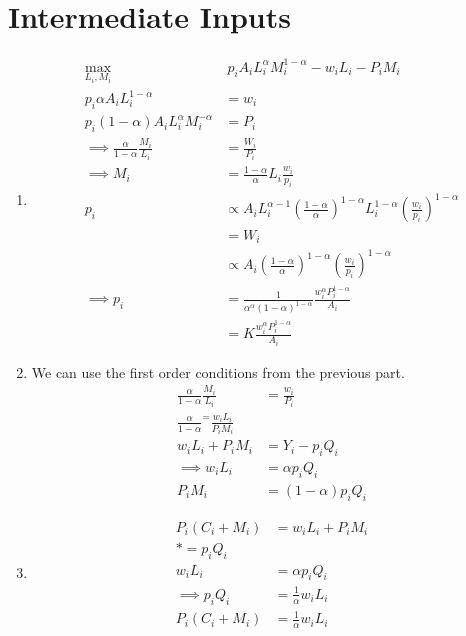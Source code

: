 \documentclass{article}
\begin{document}
\section{Intermediate Inputs}
\begin{enumerate}
    \item 
    \begin{align*}
        \max_{L_i, M_i} &\ p_i A_i L_i^\alpha M_i^{1 - \alpha} - w_i L_i - P_i M_i \\
        p_i \alpha A_i L_i^{1 - \alpha} &= w_i \tag{$L_i$}\\
        p_i(1 - \alpha) A_i L_i^\alpha M_i^{-\alpha} &= P_i \tag{$M_i$}\\
        \implies \frac{\alpha}{1 - \alpha} \frac{M_i}{L_i} &= \frac{W_i}{P_i}\\
        \implies M_i &= \frac{1 - \alpha}{\alpha} L_i \frac{w_i}{p_i}\\
        p_i &\propto A_i L_i^{\alpha - 1} \left(\frac{1 - \alpha}{\alpha}\right)^{1 - \alpha} L_i^{1 - \alpha} \left(\frac{w_i}{p_i}\right)^{1 - \alpha}\\
        &= W_i\\
        &\propto A_i \left(\frac{1 - \alpha}{\alpha}\right)^{1 - \alpha} \left(\frac{w_i}{p_i}\right)^{1 - \alpha}\\
        \implies p_i &= \frac{1}{\alpha^\alpha(1 - \alpha)^{1 - \alpha}} \frac{w_i^\alpha P_i^{1 - \alpha}}{A_i}\\
        &= K \frac{w_i^\alpha P_i^{1 - \alpha}}{A_i}
    \end{align*}
    \item
    We can use the first order conditions from the previous part.
    \begin{align*}
        \frac{\alpha}{1 - \alpha} \frac{M_i}{L_i} &= \frac{w_i}{P_i}\\
        \frac{\alpha}{1 - \alpha} ^= \frac{w_i L_i}{P_i M_i}\\
        w_i L_i + P_i M_i &= Y_i - p_i Q_i\\
        \implies w_i L_i &= \alpha p_i Q_i\\
        P_i M_i &= (1 - \alpha) p_i Q_i
    \end{align*}
    
    \item
    \begin{align*}
        P_i (C_i + M_i) &= w_i  L_i + P_i M_i\\
        *= p_i Q_i\\
        w_i L_i &= \alpha p_i Q_i\\
        \implies p_i Q_i &= \frac{1}{\alpha} w_i L_i\\
        P_i (C_i + M_i) &= \frac{1}{\alpha} w_i L_i
    \end{align*}
    

\end{enumerate}
\end{document}
